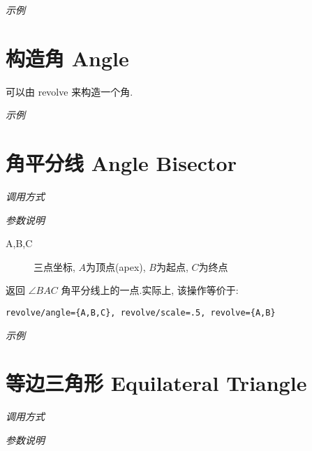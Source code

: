 \emph{示例}




\section{构造角 Angle}

可以由 revolve 来构造一个角.

\emph{示例}


\section{角平分线 Angle Bisector}

\emph{调用方式}

\begin{tcolorbox}{}
\end{tcolorbox}

\emph{参数说明}

\begin{description}
  \item[A,B,C] 三点坐标, $A$为顶点(apex), $B$为起点, $C$为终点
\end{description}

返回 $\angle{BAC}$ 角平分线上的一点.实际上, 该操作等价于:

\begin{verbatim}
revolve/angle={A,B,C}, revolve/scale=.5, revolve={A,B}
\end{verbatim}

\emph{示例}


\section{等边三角形 Equilateral Triangle}

\emph{调用方式}

\begin{tcolorbox}{}
\end{tcolorbox}

\emph{参数说明}

